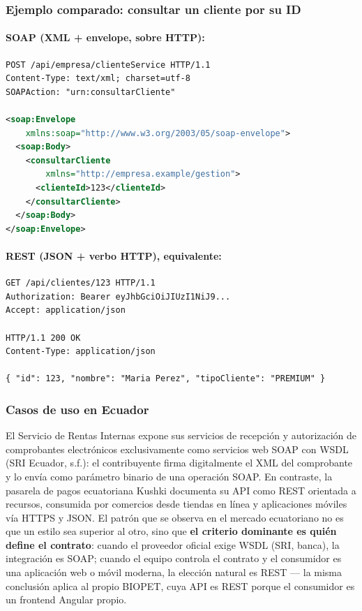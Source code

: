 \documentclass[11pt,a4paper]{article}
\newcommand{\swcite}[1]{\textcolor{blue!40!black}{(#1)}}
\begin{document}
\subsubsection{Ejemplo comparado: consultar un cliente por su ID}

\paragraph{SOAP (XML + envelope, sobre HTTP):}
\vspace{0.6cm}

\begin{lstlisting}[language=XML]
POST /api/empresa/clienteService HTTP/1.1
Content-Type: text/xml; charset=utf-8
SOAPAction: "urn:consultarCliente"

<soap:Envelope
    xmlns:soap="http://www.w3.org/2003/05/soap-envelope">
  <soap:Body>
    <consultarCliente
        xmlns="http://empresa.example/gestion">
      <clienteId>123</clienteId>
    </consultarCliente>
  </soap:Body>
</soap:Envelope>
\end{lstlisting}

\paragraph{REST (JSON + verbo HTTP), equivalente:}
\vspace{0.6cm}

\begin{lstlisting}
GET /api/clientes/123 HTTP/1.1
Authorization: Bearer eyJhbGciOiJIUzI1NiJ9...
Accept: application/json

HTTP/1.1 200 OK
Content-Type: application/json

{ "id": 123, "nombre": "Maria Perez", "tipoCliente": "PREMIUM" }
\end{lstlisting}

\subsubsection{Casos de uso en Ecuador}

El Servicio de Rentas Internas expone sus servicios de recepción y
autorización de comprobantes electrónicos exclusivamente como servicios web
SOAP con WSDL \swcite{SRI Ecuador, s.f.}: el contribuyente firma
digitalmente el XML del comprobante y lo envía como parámetro binario de
una operación SOAP. En contraste, la pasarela de pagos ecuatoriana Kushki
documenta su API como REST orientada a recursos, consumida por comercios
desde tiendas en línea y aplicaciones móviles vía HTTPS y JSON. El patrón
que se observa en el mercado ecuatoriano no es que un estilo sea superior
al otro, sino que \textbf{el criterio dominante es quién define el
contrato}: cuando el proveedor oficial exige WSDL (SRI, banca), la
integración es SOAP; cuando el equipo controla el contrato y el consumidor
es una aplicación web o móvil moderna, la elección natural es REST — la
misma conclusión aplica al propio BIOPET, cuya API es REST porque el
consumidor es un frontend Angular propio.
\end{document}
